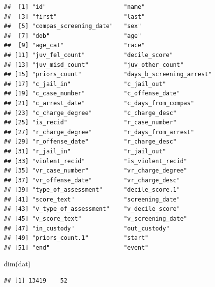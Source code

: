 \documentclass[
]{article}
\newenvironment{Shaded}{\begin{snugshade}}{\end{snugshade}}
\newcommand{\FunctionTok}[1]{\textcolor[rgb]{0.00,0.00,0.00}{#1}}
\newcommand{\NormalTok}[1]{#1}
\newcommand{\OtherTok}[1]{\textcolor[rgb]{0.56,0.35,0.01}{#1}}
\newcommand{\SpecialCharTok}[1]{\textcolor[rgb]{0.00,0.00,0.00}{#1}}
\begin{document}
\begin{verbatim}
##  [1] "id"                      "name"                   
##  [3] "first"                   "last"                   
##  [5] "compas_screening_date"   "sex"                    
##  [7] "dob"                     "age"                    
##  [9] "age_cat"                 "race"                   
## [11] "juv_fel_count"           "decile_score"           
## [13] "juv_misd_count"          "juv_other_count"        
## [15] "priors_count"            "days_b_screening_arrest"
## [17] "c_jail_in"               "c_jail_out"             
## [19] "c_case_number"           "c_offense_date"         
## [21] "c_arrest_date"           "c_days_from_compas"     
## [23] "c_charge_degree"         "c_charge_desc"          
## [25] "is_recid"                "r_case_number"          
## [27] "r_charge_degree"         "r_days_from_arrest"     
## [29] "r_offense_date"          "r_charge_desc"          
## [31] "r_jail_in"               "r_jail_out"             
## [33] "violent_recid"           "is_violent_recid"       
## [35] "vr_case_number"          "vr_charge_degree"       
## [37] "vr_offense_date"         "vr_charge_desc"         
## [39] "type_of_assessment"      "decile_score.1"         
## [41] "score_text"              "screening_date"         
## [43] "v_type_of_assessment"    "v_decile_score"         
## [45] "v_score_text"            "v_screening_date"       
## [47] "in_custody"              "out_custody"            
## [49] "priors_count.1"          "start"                  
## [51] "end"                     "event"
\end{verbatim}

\begin{Shaded}
\begin{Highlighting}[]
\FunctionTok{dim}\NormalTok{(dat)}
\end{Highlighting}
\end{Shaded}

\begin{verbatim}
## [1] 13419    52
\end{verbatim}

\begin{Shaded}
\end{Shaded}
\end{document}
